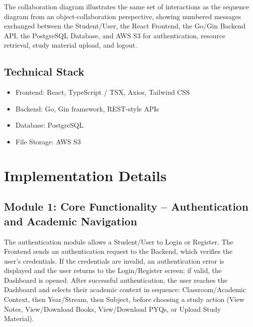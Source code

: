 \documentclass[12pt]{report}
\begin{document}
The collaboration diagram illustrates the same set of interactions as the sequence diagram from
an object-collaboration perspective, showing numbered messages exchanged between the
Student/User, the React Frontend, the Go/Gin Backend API, the PostgreSQL Database, and
AWS S3 for authentication, resource retrieval, study material upload, and logout.

\subsection{Technical Stack}
\begin{itemize}[leftmargin=*]
    \item Frontend: React, TypeScript / TSX, Axios, Tailwind CSS
    \item Backend: Go, Gin framework, REST-style APIs
    \item Database: PostgreSQL
    \item File Storage: AWS S3
\end{itemize}

\section{Implementation Details}

\subsection{Module 1: Core Functionality -- Authentication and Academic Navigation}
The authentication module allows a Student/User to Login or Register. The Frontend sends an
authentication request to the Backend, which verifies the user's credentials. If the credentials
are invalid, an authentication error is displayed and the user returns to the Login/Register
screen; if valid, the Dashboard is opened. After successful authentication, the user reaches the
Dashboard and selects their academic context in sequence: Classroom/Academic Context, then
Year/Stream, then Subject, before choosing a study action (View Notes, View/Download
Books, View/Download PYQs, or Upload Study Material).
\end{document}
